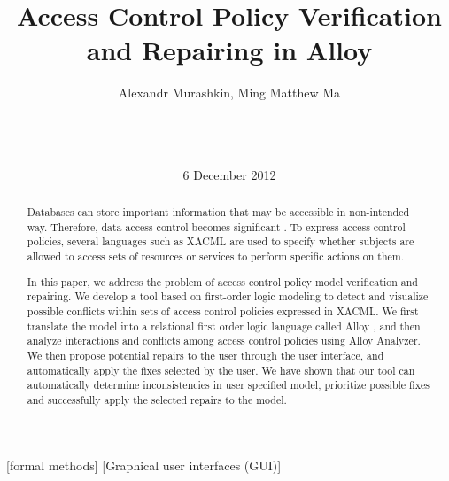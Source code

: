 \documentclass{acm_proc_article-sp}
\begin{document}
\title{Access Control Policy Verification and Repairing in Alloy}


\author{
\alignauthor Alexandr Murashkin, Ming Matthew Ma \\
       \\
       \\
       \\
}
\date{6 December 2012}
\maketitle

\begin{abstract}

Databases can store important information that may be accessible in non-intended way. Therefore, data access control becomes significant \cite{Fisler:2005:VCA:1062455.1062502}. To express access control policies, several languages such as XACML \cite{oasis:xacml} are used to specify whether subjects are allowed to access sets of resources or services to perform specific actions on them. 

In this paper, we address the problem of access control policy model verification and repairing. We develop a tool based on first-order logic modeling to detect and visualize possible conflicts within sets of access control policies expressed in XACML. We first translate the model into a relational first order logic language called Alloy \cite{jackson:alloy}, and then analyze interactions and conflicts among access control policies using Alloy Analyzer. We then propose potential repairs to the user through the user interface, and automatically apply the fixes selected by the user. We have shown that our tool can automatically determine inconsistencies in user specified model, prioritize possible fixes and successfully apply the selected repairs to the model. 

\end{abstract}

[formal methods]
[Graphical user interfaces (GUI)]

\end{document}
